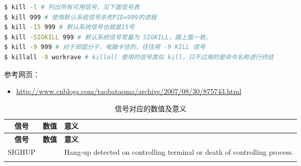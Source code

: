 \documentclass[doctor,openright,twoside]{sjtuthesis}
\providecommand{\tightlist}{%
    \setlength{\itemsep}{0pt}\setlength{\parskip}{0pt}}
\theoremstyle{plain}
\theoremstyle{definition}
\theoremstyle{remark}
\theoremstyle{ocrenumbox}
\theoremstyle{plain}
\begin{document}
\begin{lstlisting}[language=bash]
$ kill -l # 列出所有可用信号，见下面信号表
$ kill 999 # 使用默认系统信号杀死PID=999的进程
$ kill -15 999 # 默认系统信号也就是15号
$ kill -SIGKILL 999 # 默认系统信号常量为 SIGKILL，跟上面一致。
$ kill -9 999 # 对于顽固分子，电脑卡住的，往往用 -9 KILL 信号
$ killall -9 workrave # killall 使用的信号类似 kill，只不过用的是命令名称进行终结
\end{lstlisting}

参考网页：

\begin{itemize}
\tightlist
\item
  \url{http://www.cnblogs.com/taobataoma/archive/2007/08/30/875743.html}
\end{itemize}

\begin{longtable}[]{@{}ccl@{}}
\caption{信号对应的数值及意义}\tabularnewline
\toprule
\begin{minipage}[b]{0.10\columnwidth}\centering
\textbf{信号}\strut
\end{minipage} & \begin{minipage}[b]{0.12\columnwidth}\centering
\textbf{数值}\strut
\end{minipage} & \begin{minipage}[b]{0.70\columnwidth}\raggedright
\textbf{意义}\strut
\end{minipage}\tabularnewline
\midrule
\endfirsthead
\toprule
\begin{minipage}[b]{0.10\columnwidth}\centering
\textbf{信号}\strut
\end{minipage} & \begin{minipage}[b]{0.12\columnwidth}\centering
\textbf{数值}\strut
\end{minipage} & \begin{minipage}[b]{0.70\columnwidth}\raggedright
\textbf{意义}\strut
\end{minipage}\tabularnewline
\midrule
\endhead
\begin{minipage}[t]{0.10\columnwidth}\centering
SIGHUP\strut
\end{minipage} & \begin{minipage}[t]{0.12\columnwidth}\centering
1\strut
\end{minipage} & \begin{minipage}[t]{0.70\columnwidth}\raggedright
Hang-up detected on controlling terminal or death of controlling
process.\strut
\end{minipage}\tabularnewline
\begin{minipage}[t]{0.10\columnwidth}\centering

\end{minipage}
\end{longtable}
\end{document}
